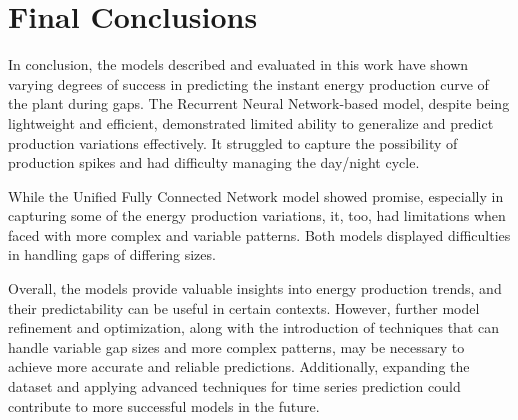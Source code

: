 \section{Final Conclusions}
In conclusion, the models described and evaluated in this work have shown varying degrees of success in predicting the instant energy production curve of the plant during gaps. The Recurrent Neural Network-based model, despite being lightweight and efficient, demonstrated limited ability to generalize and predict production variations effectively. It struggled to capture the possibility of production spikes and had difficulty managing the day/night cycle.

While the Unified Fully Connected Network model showed promise, especially in capturing some of the energy production variations, it, too, had limitations when faced with more complex and variable patterns. Both models displayed difficulties in handling gaps of differing sizes.

Overall, the models provide valuable insights into energy production trends, and their predictability can be useful in certain contexts. However, further model refinement and optimization, along with the introduction of techniques that can handle variable gap sizes and more complex patterns, may be necessary to achieve more accurate and reliable predictions. Additionally, expanding the dataset and applying advanced techniques for time series prediction could contribute to more successful models in the future.